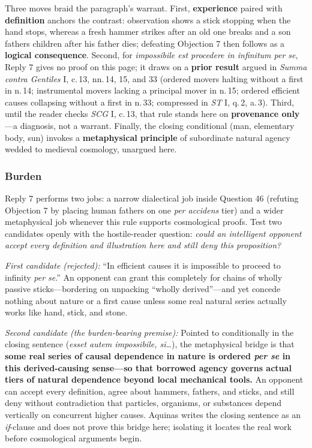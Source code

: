 Three moves braid the paragraph's warrant. First, \textbf{experience} paired with \textbf{definition} anchors the contrast: observation shows a stick stopping when the hand stops, whereas a fresh hammer strikes after an old one breaks and a son fathers children after his father dies; defeating Objection 7 then follows as a \textbf{logical consequence}. Second, for \emph{impossibile est procedere in infinitum per se}, Reply 7 gives no proof on this page; it draws on a \textbf{prior result} argued in \emph{Summa contra Gentiles} I, c.\,13, nn.\,14, 15, and 33 (ordered movers halting without a first in n.\,14; instrumental movers lacking a principal mover in n.\,15; ordered efficient causes collapsing without a first in n.\,33; compressed in \emph{ST} I, q.\,2, a.\,3). Third, until the reader checks \emph{SCG} I, c.\,13, that rule stands here on \textbf{provenance only}---a diagnosis, not a warrant. Finally, the closing conditional (man, elementary body, sun) invokes a \textbf{metaphysical principle} of subordinate natural agency wedded to medieval cosmology, unargued here.

\subsubsection*{Burden}

Reply 7 performs two jobs: a narrow dialectical job inside Question 46 (refuting Objection 7 by placing human fathers on one \emph{per accidens} tier) and a wider metaphysical job whenever this rule supports cosmological proofs. Test two candidates openly with the hostile-reader question: \emph{could an intelligent opponent accept every definition and illustration here and still deny this proposition?}

\emph{First candidate (rejected):} ``In efficient causes it is impossible to proceed to infinity \emph{per se}.'' An opponent can grant this completely for chains of wholly passive sticks---bordering on unpacking ``wholly derived''---and yet concede nothing about nature or a first cause unless some real natural series actually works like hand, stick, and stone.

\emph{Second candidate (the burden-bearing premise):} Pointed to conditionally in the closing sentence (\emph{esset autem impossibile, si\dots}), the metaphysical bridge is that \textbf{some real series of causal dependence in nature is ordered \emph{per se} in this derived-causing sense---so that borrowed agency governs actual tiers of natural dependence beyond local mechanical tools.} An opponent can accept every definition, agree about hammers, fathers, and sticks, and still deny without contradiction that particles, organisms, or substances depend vertically on concurrent higher causes. Aquinas writes the closing sentence as an \emph{if}-clause and does not prove this bridge here; isolating it locates the real work before cosmological arguments begin.

